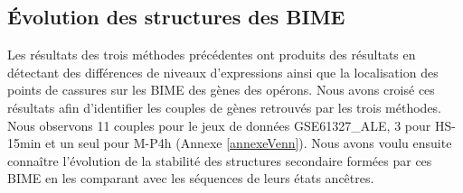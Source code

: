 \documentclass[12pt,a4paper]{report}
\begin{document}
\begin{onehalfspace}
\section*{Évolution des structures des BIME}
Les résultats des trois méthodes précédentes ont produits des résultats en détectant des différences de niveaux d'expressions ainsi que la localisation des points de cassures sur les BIME des gènes des opérons. Nous avons croisé ces résultats afin d'identifier les couples de gènes retrouvés par les trois méthodes. Nous observons 11 couples pour le jeux de données GSE61327\_ALE, 3 pour HS-15min et un seul pour M-P4h (Annexe \ref{annexeVenn}). Nous avons voulu ensuite connaître l'évolution de la stabilité des structures secondaire formées par ces BIME en les comparant avec les séquences de leurs états ancêtres.

\begin{figure}
\end{figure}
\end{onehalfspace}
\end{document}
